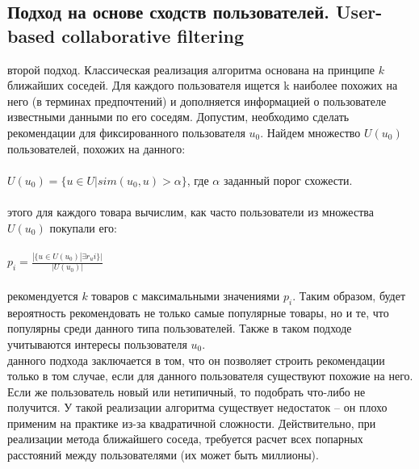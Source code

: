 \documentclass{article}
\newcommand\tab[1][1cm]{\hspace*{#1}}
\begin{document}
\subsection{Подход на основе сходств пользователей. User-based collaborative filtering}
 второй подход. Классическая реализация алгоритма основана на принципе $k$ ближайших соседей. Для каждого пользователя ищется k наиболее похожих на него (в терминах предпочтений) и дополняется информацией о пользователе известными данными по его соседям. Допустим, необходимо сделать рекомендации для фиксированного пользователя $u_0$. Найдем множество ﻿$U(u_0)$ пользователей, похожих на данного:\\
\\
\tab$U(u_0)=\{u\in U|sim(u_0,u)>\alpha\}$, где ﻿$\alpha$ заданный порог схожести.\\
\\
 этого для каждого товара вычислим, как часто пользователи из множества $U(u_0)$ покупали его:\\
\\
\tab$p_i=\frac{|\{u\in U(u_0)|\exists r_ui\}|}{|U(u_0)|}$\\
\\
 рекомендуется ﻿$k$ товаров с максимальными значениями ﻿$p_i$. Таким образом, будет вероятность рекомендовать не только самые популярные товары, но и те, что популярны среди данного типа пользователей. Также в таком подходе учитываются интересы пользователя $u_0$﻿.\\
 данного подхода заключается в том, что он позволяет строить рекомендации только в том случае, если для данного пользователя существуют похожие на него. Если же пользователь новый или нетипичный, то подобрать что-либо не получится. У такой реализации алгоритма существует недостаток – он плохо применим на практике из-за квадратичной сложности. Действительно, при реализации метода ближайшего соседа, требуется расчет всех попарных расстояний между пользователями (их может быть миллионы).
\end{document}
